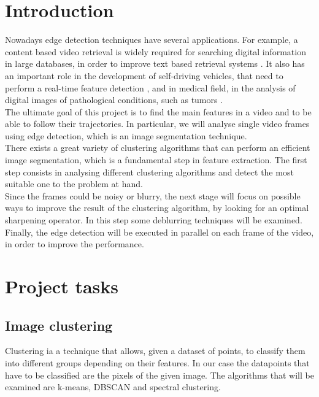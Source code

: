 \documentclass[11pt]{article}
\begin{document}
\section*{Introduction}
Nowadays edge detection techniques have several applications. For example,  a content based video retrieval is widely required for searching digital information in large databases, in order to improve text based retrieval systems \cite{1}. It also has an important role in the development of self-driving vehicles, that need to perform a real-time feature detection \cite{2}, and in medical field, in the analysis of digital images of pathological conditions, such as tumors \cite{3}.    \\
The ultimate goal of this project is to find the main features in a video and to be able to follow their trajectories. In particular, we will analyse single video frames using edge detection, which is an image segmentation technique.  \\
There exists a great variety of clustering algorithms that can perform an efficient image segmentation, which is a fundamental step in feature extraction.  The first step consists in analysing different clustering algorithms and detect the most suitable one to the problem at hand. \\
Since the frames could be noisy or blurry, the next stage will focus on possible ways to improve the result of the clustering algorithm, by looking for an optimal sharpening operator. In this step some deblurring techniques will be examined. \\
Finally, the edge detection will be executed in parallel on each frame of the video, in order to improve the performance. 

\newpage
\section{Project tasks}
\subsection{Image clustering}
Clustering ia a technique that allows, given a dataset of points, to classify them into different groups depending on their features. In our case the datapoints that have to be classified are the pixels of the given image. The  algorithms that will be examined are k-means, DBSCAN and spectral clustering. 
\end{document}
